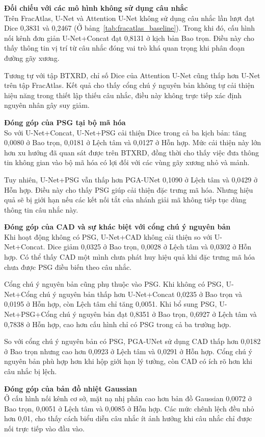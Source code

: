 \noindent\textbf{Đối chiếu với các mô hình không sử dụng câu nhắc}\\
Trên FracAtlas, U-Net và Attention U-Net không sử dụng câu nhắc lần lượt đạt Dice 0,3831 và 0,2467 (Ở bảng~\ref{tab:fracatlas_baseline}). Trong khi đó, cấu hình nối kênh đơn giản U-Net+Concat đạt 0,8131 ở kịch bản Bao trọn. Điều này cho thấy thông tin vị trí từ câu nhắc đóng vai trò khá quan trọng khi phân đoạn đường gãy xương.

Tương tự với tập BTXRD, chỉ số Dice của Attention U-Net cũng thấp hơn U-Net trên tập FracAtlas. Kết quả cho thấy cổng chú ý nguyên bản không tự cải thiện hiệu năng trong thiết lập thiếu câu nhắc, điều này không trực tiếp xác định nguyên nhân gây suy giảm.

\noindent\textbf{Đóng góp của PSG tại bộ mã hóa}\\
So với U-Net+Concat, U-Net+PSG cải thiện Dice trong cả ba kịch bản: tăng 0,0080 ở Bao trọn, 0,0181 ở Lệch tâm và 0,0127 ở Hỗn hợp. Mức cải thiện này lớn hơn xu hướng đã quan sát được trên BTXRD, đồng thời cho thấy việc đưa thông tin không gian vào bộ mã hóa có lợi đối với các vùng gãy xương nhỏ và mảnh.

Tuy nhiên, U-Net+PSG vẫn thấp hơn PGA-UNet 0,1090 ở Lệch tâm và 0,0429 ở Hỗn hợp. Điều này cho thấy PSG giúp cải thiện đặc trưng mã hóa. Nhưng hiệu quả sẽ bị giới hạn nếu các kết nối tắt của nhánh giải mã không tiếp tục dùng thông tin câu nhắc này.

\noindent\textbf{Đóng góp của CAD và sự khác biệt với cổng chú ý nguyên bản}\\
Khi hoạt động không có PSG, U-Net+CAD không cải thiện so với U-Net+Concat. Dice giảm 0,0325 ở Bao trọn, 0,0028 ở Lệch tâm và 0,0302 ở Hỗn hợp. Có thể thấy CAD một mình chưa phát huy hiệu quả khi đặc trưng mã hóa chưa được PSG điều biến theo câu nhắc.

Cổng chú ý nguyên bản cũng phụ thuộc vào PSG. Khi không có PSG, U-Net+Cổng chú ý nguyên bản thấp hơn U-Net+Concat 0,0235 ở Bao trọn và 0,0195 ở Hỗn hợp, còn Lệch tâm chỉ tăng 0,0051. Khi bổ sung PSG, U-Net+PSG+Cổng chú ý nguyên bản đạt 0,8351 ở Bao trọn, 0,6927 ở Lệch tâm và 0,7838 ở Hỗn hợp, cao hơn cấu hình chỉ có PSG trong cả ba trường hợp.

So với cổng chú ý nguyên bản có PSG, PGA-UNet sử dụng CAD thấp hơn 0,0182 ở Bao trọn nhưng cao hơn 0,0923 ở Lệch tâm và 0,0291 ở Hỗn hợp. Cổng chú ý nguyên bản phù hợp hơn khi hộp giới hạn lý tưởng, còn CAD có ích rõ hơn khi câu nhắc bị lệch.

\noindent\textbf{Đóng góp của bản đồ nhiệt Gaussian}\\
Ở cấu hình nối kênh cơ sở, mặt nạ nhị phân cao hơn bản đồ Gaussian 0,0072 ở Bao trọn, 0,0051 ở Lệch tâm và 0,0085 ở Hỗn hợp. Các mức chênh lệch đều nhỏ hơn 0,01, cho thấy cách biểu diễn câu nhắc ít ảnh hưởng khi câu nhắc chỉ được nối trực tiếp vào đầu vào.

